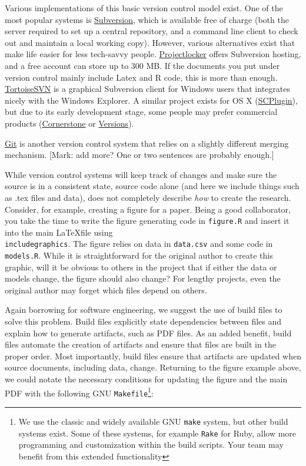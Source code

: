 \documentclass[]{article}
\begin{document}
Various implementations of this basic version control model exist. One of the most 
popular systems is \href{http://subversion.tigris.org/}{Subversion}, which is available 
free of charge (both the server required to set up a central repository, and a command 
line client to check out and maintain a local working copy). However, various 
alternatives exist that make life easier for less tech-savvy people. \href{http://
www.projectlocker.com/}{Projectlocker} offers Subversion hosting, and a free account 
can store up to 300 MB. If the documents you put under version control mainly include 
Latex and R code, this is more than enough. \href{http://tortoisesvn.tigris.org/}
{TortoiseSVN} is a graphical Subversion client for Windows users that integrates nicely 
with the Windows Explorer. A similar project exists for OS X (\href{http://
scplugin.tigris.org/}{SCPlugin}), but due to its early development stage, some people 
may prefer commercial products (\href{http://www.zennaware.com/cornerstone/}
{Cornerstone} or \href{http://versionsapp.com/}{Versions}). 

\href{http://git-scm.com/}{Git} is another version control system that relies on a 
slightly different merging mechanism. [Mark: add more? One or two sentences are 
probably enough.] 



While version control systems will keep track of changes and make sure the
source is in a consistent state,  %
source code alone (and here we include things such as .tex files and data),
does not completely describe \emph{how} to create the research. Consider, for
example, creating a figure for a paper. Being a good collaborator, you take
the time to write the figure generating code in \texttt{figure.R} and insert
it into the main \LaTeX file using
\texttt{\\includegraphics}. The figure relies on data in \texttt{data.csv} and
some code in \texttt{models.R}. While it is straightforward for the original
author to create this graphic, will it be obvious to others in the project
that if either the data or models change, the figure should also change? For
lengthy projects, even the original author may forget which files depend on
others.

Again borrowing for software engineering, we suggest the use of build files to
solve this problem. Build files explicitly state dependencies between files
and explain how to generate artifacts, such as PDF files. As an added benefit,
build files automate the creation of artifacts and ensure that files are built
in the proper order. Most importantly, build files ensure that artifacts are
updated when source documents, including data, change. Returning to the figure
example above, we could notate the necessary conditions for updating the
figure and the main PDF with the following GNU \texttt{Makefile}\footnote{We
use the classic and widely available GNU \texttt{make} system, but other build
systems exist. Some of these systems, for example \texttt{Rake} for Ruby,
allow more programming and customization within the build scripts. Your team
may benefit from this extended functionality}:
\end{document}
